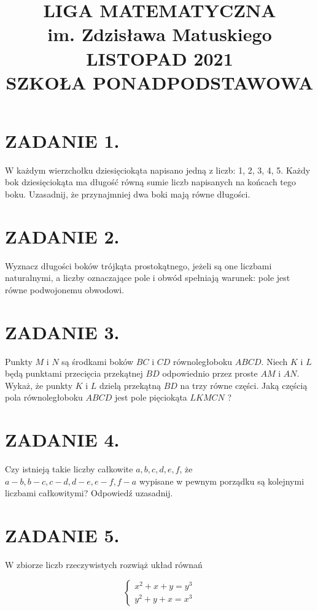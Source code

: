 \documentclass[10pt]{article}
\title{LIGA MATEMATYCZNA \\
 im. Zdzisława Matuskiego \\
 LISTOPAD 2021 \\
 SZKOŁA PONADPODSTAWOWA }
\author{}
\date{}
\begin{document}
\maketitle
\section*{ZADANIE 1.}
W każdym wierzchołku dziesięciokąta napisano jedną z liczb: 1, 2, 3, 4, 5. Każdy bok dziesięciokąta ma długość równą sumie liczb napisanych na końcach tego boku. Uzasadnij, że przynajmniej dwa boki mają równe długości.

\section*{ZADANIE 2.}
Wyznacz długości boków trójkąta prostokątnego, jeżeli są one liczbami naturalnymi, a liczby oznaczające pole i obwód spełniają warunek: pole jest równe podwojonemu obwodowi.

\section*{ZADANIE 3.}
Punkty \(M\) i \(N\) są środkami boków \(B C\) i \(C D\) równoległoboku \(A B C D\). Niech \(K\) i \(L\) będą punktami przecięcia przekątnej \(B D\) odpowiednio przez proste \(A M\) i \(A N\). Wykaż, że punkty \(K\) i \(L\) dzielą przekątną \(B D\) na trzy równe części. Jaką częścią pola równoległoboku \(A B C D\) jest pole pięciokąta \(L K M C N\) ?

\section*{ZADANIE 4.}
Czy istnieją takie liczby całkowite \(a, b, c, d, e, f\), że \(a-b, b-c, c-d, d-e, e-f, f-a\) wypisane w pewnym porządku są kolejnymi liczbami całkowitymi? Odpowiedź uzasadnij.

\section*{ZADANIE 5.}
W zbiorze liczb rzeczywistych rozwiąż układ równań

\[
\left\{\begin{array}{l}
x^{2}+x+y=y^{3} \\
y^{2}+y+x=x^{3}
\end{array}\right.
\]
\end{document}
